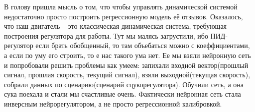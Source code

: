 \documentclass[14pt,twoside]{article}
\begin{document}
В голову пришла мысль о том, что чтобы управлять динамической системой недостаточно просто построить регрессионную модель её отзывов. Оказалось, что наш двигатель -- это классическая динамическая система, требующая построения регулятора для работы. Тут мы малясь загрустили, ибо ПИД-регулятор если брать обобщенный, то там объебаться можно с коеффициентами, а если по уму его строить, то е нас такого ума нет.
Ее мы взяли нейронную сеть и попробовали решить проблемы как умеем: запихали входной вектор(прошлый сигнал, прошлая скорость, текущий сигнал), взяли выходной(текущая скорость), собрали данных по сценарию(сценарий сцукорегулятора). Обучили сеть, а она сука поехала и стали мы счастливые очень. Фактически нейронная сеть стала инверсным нейрорегулятором, а не просто регрессионной калибровкой.
\end{document}
